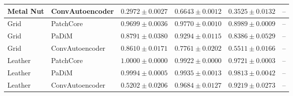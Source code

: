 \begin{table}[t]
{\begin{tabular}{llcccc}
Metal Nut & ConvAutoencoder & $0.2972 \pm 0.0027$ & $0.6643 \pm 0.0012$ & $0.3525 \pm 0.0132$ & $\text{--}$ \\
\midrule
Grid & PatchCore & $0.9699 \pm 0.0036$ & $0.9770 \pm 0.0010$ & $0.8989 \pm 0.0009$ & $\text{--}$ \\
Grid & PaDiM & $0.8791 \pm 0.0380$ & $0.9294 \pm 0.0115$ & $0.8386 \pm 0.0529$ & $\text{--}$ \\
Grid & ConvAutoencoder & $0.8610 \pm 0.0171$ & $0.7761 \pm 0.0202$ & $0.5511 \pm 0.0166$ & $\text{--}$ \\
\midrule
Leather & PatchCore & $1.0000 \pm 0.0000$ & $0.9922 \pm 0.0000$ & $0.9721 \pm 0.0003$ & $\text{--}$ \\
Leather & PaDiM & $0.9994 \pm 0.0005$ & $0.9935 \pm 0.0013$ & $0.9813 \pm 0.0042$ & $\text{--}$ \\
Leather & ConvAutoencoder & $0.5202 \pm 0.0206$ & $0.9684 \pm 0.0127$ & $0.9219 \pm 0.0273$ & $\text{--}$ \\
\bottomrule
\end{tabular}}
\end{table}
